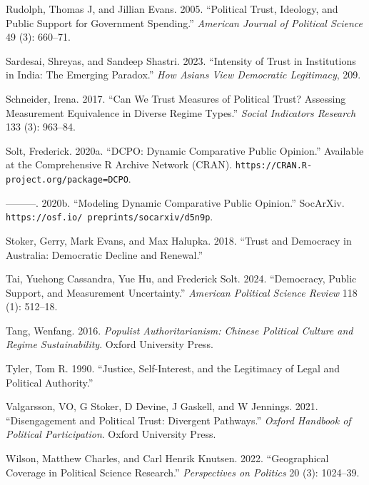 \documentclass[
  12pt,
]{article}
\newlength{\cslhangindent}
\newenvironment{CSLReferences}[2] %
 {\begin{list}{}{%
  \setlength{\itemindent}{0pt}
  \setlength{\leftmargin}{0pt}
  \setlength{\parsep}{0pt}
  \ifodd #1
   \setlength{\leftmargin}{\cslhangindent}
   \setlength{\itemindent}{-1\cslhangindent}
  \fi
  \setlength{\itemsep}{#2\baselineskip}}}
 {\end{list}}
\begin{document}
\begin{CSLReferences}{1}{0}
Rudolph, Thomas J, and Jillian Evans. 2005. {``Political Trust, Ideology, and Public Support for Government Spending.''} \emph{American Journal of Political Science} 49 (3): 660--71.

Sardesai, Shreyas, and Sandeep Shastri. 2023. {``Intensity of Trust in Institutions in India: The Emerging Paradox.''} \emph{How Asians View Democratic Legitimacy}, 209.

Schneider, Irena. 2017. {``Can We Trust Measures of Political Trust? Assessing Measurement Equivalence in Diverse Regime Types.''} \emph{Social Indicators Research} 133 (3): 963--84.

Solt, Frederick. 2020a. {``{DCPO}: Dynamic Comparative Public Opinion.''} Available at the Comprehensive R Archive Network (CRAN). \texttt{https://CRAN.R-project.org/package=DCPO}.

---------. 2020b. {``Modeling Dynamic Comparative Public Opinion.''} SocArXiv. \texttt{https://osf.io/\ preprints/socarxiv/d5n9p}.

Stoker, Gerry, Mark Evans, and Max Halupka. 2018. {``Trust and Democracy in Australia: Democratic Decline and Renewal.''}

Tai, Yuehong Cassandra, Yue Hu, and Frederick Solt. 2024. {``Democracy, Public Support, and Measurement Uncertainty.''} \emph{American Political Science Review} 118 (1): 512--18.

Tang, Wenfang. 2016. \emph{Populist Authoritarianism: Chinese Political Culture and Regime Sustainability}. Oxford University Press.

Tyler, Tom R. 1990. {``Justice, Self-Interest, and the Legitimacy of Legal and Political Authority.''}

Valgarsson, VO, G Stoker, D Devine, J Gaskell, and W Jennings. 2021. {``Disengagement and Political Trust: Divergent Pathways.''} \emph{Oxford Handbook of Political Participation}. Oxford University Press.

Wilson, Matthew Charles, and Carl Henrik Knutsen. 2022. {``Geographical Coverage in Political Science Research.''} \emph{Perspectives on Politics} 20 (3): 1024--39.


\end{CSLReferences}
\end{document}
